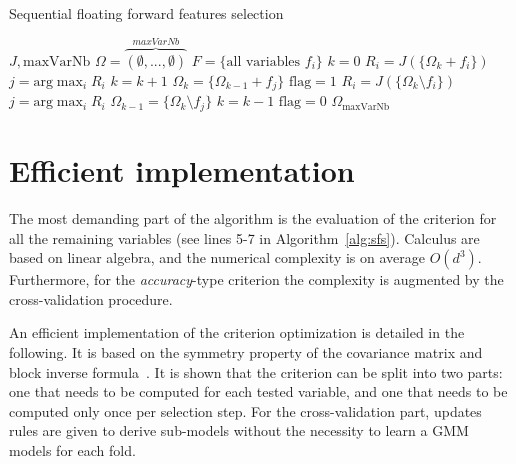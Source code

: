 \documentclass[journal,peerreview,onecolumn]{IEEEtran}
\begin{document}
        \begin{algorithm}
        \caption{Sequential floating forward features selection\label{alg:sffs}}
        {\footnotesize
        \begin{algorithmic}[1]
        \REQUIRE $J,\text{maxVarNb}$
        \STATE $\Omega=\overbrace{(\emptyset,...,\emptyset)}^{maxVarNb}$
        \STATE $F=\text{\{all variables $f_i$\}}$
        \STATE $k=0$
        \STATE $R_i = J(\{\Omega_k + f_i\})$
        \ENDFOR
        \STATE $j=\text{arg} \max_{i} R_i$
        \STATE $k=k+1$
        \STATE $\Omega_k = \{\Omega_{k-1} + f_j\}$
        \STATE $\text{flag}=1$
        \STATE $R_i = J(\{\Omega_k \setminus f_i\})$
        \ENDFOR
        \STATE $j=\text{arg} \max_{i} R_i$
        \STATE $\Omega_{k-1} = \{\Omega_k \setminus f_j\}$
        \STATE $k=k-1$
        \ELSE
        \STATE $\text{flag}=0$
        \ENDIF
        \ENDWHILE
        \ENDIF
        \ENDWHILE
        \RETURN $\Omega_{\text{maxVarNb}}$
        \end{algorithmic}
        }
        \end{algorithm}


\section{Efficient implementation}
\label{sec:implementation}
The most  demanding part  of the  algorithm is  the evaluation  of the
criterion  for  all   the  remaining  variables  (see   lines  5-7  in
Algorithm~\ref{alg:sfs}). Calculus are based on linear algebra, and the
numerical  complexity is  on average  $O(d^3)$.  Furthermore,  for the
\emph{accuracy}-type  criterion the  complexity  is  augmented by  the
cross-validation procedure.

An efficient implementation of  the criterion optimization is detailed
in  the following.   It  is  based on  the  symmetry  property of  the
covariance matrix  and block inverse  formula~\cite{IMM2012-03274}.  It is shown  that the criterion  can be split  into two
parts: one that needs to be computed for each tested variable, and one
that  needs to  be  computed only  once per  selection  step. For  the
cross-validation part,  updates rules  are given to  derive sub-models
without the necessity to learn a GMM models for each fold.
\end{document}
